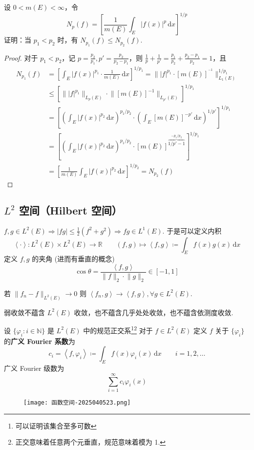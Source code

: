 \begin{exercise}
设 $0<m(E)<\infty$，令
\[
N_{p}(f)=\left[ \frac{1}{m(E)} \int_{E}^{} \lvert f(x) \rvert ^{p} \, \mathrm{d}x  \right]^{1/p }
\]
证明：当 $p_1<p_2$ 时，有 $N_{p_1}(f)\leq N_{p_2}(f)$.
\end{exercise}
\begin{proof}
对于 $p_1<p_2$，记 $p=\frac{p_2}{p_1},p'=\frac{p_2}{p_2-p_1}$，则 $\frac{1}{p}+\frac{1}{p'}=\frac{p_1}{p_2}+\frac{p_2-p_1}{p_2}=1$，且
\[
\begin{aligned}
N_{p_1}(f) & =\left[  \int_{E}^{} \lvert f(x) \rvert ^{p_1}\cdot\frac{1}{m(E)}  \, \mathrm{d}x  \right]^{1/p_1} =\lVert \lvert f \rvert ^{p_1}\cdot [m(E)]^{^{-1}} \rVert_{L_1(E)}^{1/p_1} \\
 & \leq [\lVert \lvert f \rvert ^{p_1} \rVert _{L_{p}(E)}\cdot \lVert [m(E)]^{-1} \rVert _{L_{p'}(E)}]^{1/p_1}  \\
 & =\left[ \left( \int_{E}^{ } \lvert f(x) \rvert ^{p_2} \, \mathrm{d}x   \right)^{p_1/p_2 }\cdot \left( \int_{E}^{} [m(E)]^{-p'} \, \mathrm{d}x  \right)^{1/p'} \right]^{1/p_1} \\
 & =\left[ \left( \int_{E}^{ } \lvert f(x) \rvert ^{p_2} \, \mathrm{d}x   \right)^{p_1/p_2 }\cdot[m(E)]^{\overbrace{ 1/p'-1 }^{ -p_1/p_2 }}  \right]^{1/p_1} \\
 & =\left[ \frac{1}{m(E)} \int_{E}^{} \lvert f(x) \rvert ^{p_2} \, \mathrm{d}x  \right]^{1/p_2}=N_{p_2}(f)
\end{aligned}
\]
\end{proof}

\subsection{\texorpdfstring{$L^{2}$}{L^2} 空间（Hilbert 空间）}

$f, g\in L^2 (E)\Rightarrow \lvert fg \rvert\leq\frac{1}{2}(f^2+g^2)\Rightarrow fg\in L^{1}(E)$. 于是可以定义内积
\[
\left< \cdot \right>:L^2(E)\times L^2(E)\to \mathbb{R}\qquad (f,g)\mapsto\left< f,g \right>\coloneqq \int_{E}^{} f(x)g(x) \, \mathrm{d}x
\]
定义 $f,g$ 的夹角 (进而有垂直的概念)
\[
\cos\theta=\frac{\left< f,g \right> }{\lVert f \rVert _{2}\cdot \lVert g \rVert _{2}}\in[-1,1]
\]
\begin{theorem}[$L^2(E)$ 收敛蕴含弱收敛]
若 $\lVert f_n-f \rVert_{L^2(E)}\to0$ 则 $\left< f_n,g \right>\to\left< f,g \right>,\forall g\in L^2(E)$.
\end{theorem}
\begin{remark}
弱收敛不蕴含 $L^2(E)$ 收敛，也不蕴含几乎处处收敛，也不蕴含依测度收敛.
\end{remark}
设 $\{ \varphi _i:i\in \mathbb{N} \}$ 是 $L^2(E)$ 中的规范正交系\footnote{可以证明该集合至多可数}\footnote{正交意味着任意两个元垂直，规范意味着模为 1.} 对于 $f\in L^2(E)$ 定义 $f$ 关于 $\{ \varphi _i \}$ 的\textbf{广义 Fourier 系数}为
\[
c_i= \left< f,\varphi _i \right> \coloneqq \int_{E}^{} f(x)\varphi _i(x) \, \mathrm{d}x \qquad i=1,2,\dots
\]
广义 Fourier 级数为
\[
\sum_{i=1}^{\infty} c_i\varphi _i(x)
\]
\begin{figure}[H]
\centering
\texttt{[image: 函数空间-2025040523.png]}
\label{}
\end{figure}

